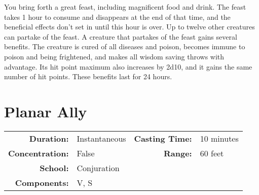 \documentclass[a5paper, 12pt]{memoir}
\begin{document}
\vspace{1\baselineskip}\noindent You bring forth a great feast, including magnificent food and drink. The feast takes 1 hour to consume and disappears at the end of that time, and the beneficial effects don't set in until this hour is over. Up to twelve other creatures can partake of the feast. A creature that partakes of the feast gains several benefits. The creature is cured of all diseases and poison, becomes immune to poison and being frightened, and makes all wisdom saving throws with advantage. Its hit point maximum also increases by 2d10, and it gains the same number of hit points. These benefits last for 24 hours.

\newpage
\section*{Planar Ally}

{
\small\centering\vspace{-6pt}
\begin{tabular}{rlrl}
\toprule

\textbf{Duration:} & Instantaneous &
\textbf{Casting Time:} & 10 minutes \\
\textbf{Concentration:} & False &
\textbf{Range:} & 60 feet \\
\textbf{School:} & Conjuration \\
\textbf{Components:} & \multicolumn{3}{p{0.7\textwidth}}{V, S}\\

\bottomrule
\end{tabular}
}
\end{document}
